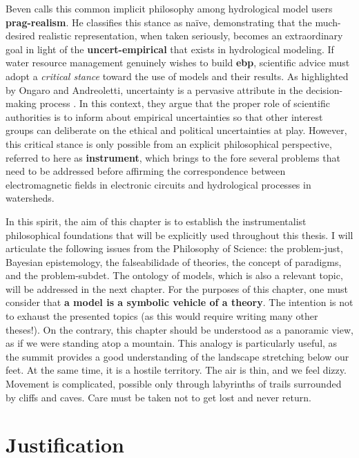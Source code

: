 \documentclass[./main_en.tex]{subfiles}
\begin{document}
\par Beven calls this common implicit philosophy among hydrological model users \textbf{\gls{prag-realism}}. He classifies this stance as naïve, demonstrating that the much-desired realistic representation, when taken seriously, becomes an extraordinary goal in light of the \textbf{\gls{uncert-empirical}} that exists in hydrological modeling. If water resource management genuinely wishes to build \textbf{\gls{ebp}}, scientific advice must adopt a \textit{critical stance} toward the use of models and their results. As highlighted by Ongaro and Andreoletti, uncertainty is a pervasive attribute in the decision-making process \cite{Ongaro2022}. In this context, they argue that the proper role of scientific authorities is to inform about empirical uncertainties so that other interest groups can deliberate on the ethical and political uncertainties at play. However, this critical stance is only possible from an explicit philosophical perspective, referred to here as \textbf{\gls{instrument}}, which brings to the fore several problems that need to be addressed before affirming the correspondence between electromagnetic fields in electronic circuits and hydrological processes in watersheds.

\par In this spirit, the aim of this chapter is to establish the instrumentalist philosophical foundations that will be explicitly used throughout this thesis. I will articulate the following issues from the Philosophy of Science: the \gls{problem-just}, Bayesian epistemology, the \gls{falseabilidade} of theories, the concept of paradigms, and the \gls{problem-subdet}. The ontology of models, which is also a relevant topic, will be addressed in the next chapter. For the purposes of this chapter, one must consider that \textbf{a \gls{model} is a symbolic vehicle of a theory}. The intention is not to exhaust the presented topics (as this would require writing many other theses!). On the contrary, this chapter should be understood as a panoramic view, as if we were standing atop a mountain. This \gls{analogy} is particularly useful, as the summit provides a good understanding of the landscape stretching below our feet. At the same time, it is a hostile territory. The air is thin, and we feel dizzy. Movement is complicated, possible only through labyrinths of trails surrounded by cliffs and caves. Care must be taken not to get lost and never return.

\section{Justification} \label{sec:epis:justific}
\end{document}
